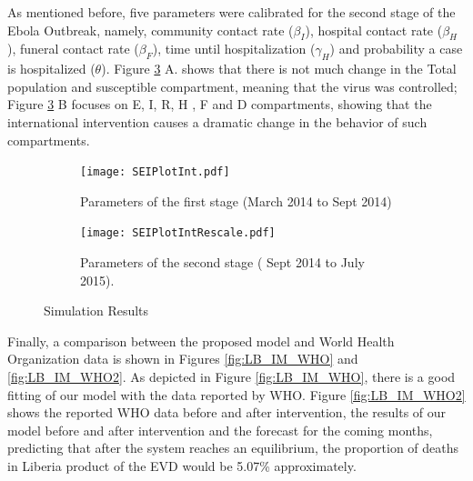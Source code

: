 \noindent As mentioned before, five parameters were calibrated for the second stage of the Ebola Outbreak, namely, community contact rate ($\beta_I$), hospital contact rate ($\beta_H$), funeral contact rate ($\beta_F$), time until hospitalization ($\gamma_H$) and probability a case is hospitalized ($\theta$). Figure \ref{fig:LB_IM_In} A. shows that there is not much change in the Total population and susceptible compartment, meaning that the virus was controlled;  Figure \ref{fig:LB_IM_In} B focuses on E, I, R, H , F and D compartments, showing that the international intervention causes a dramatic change in the behavior of such compartments.


\begin{figure}[h!]
 \centering 
 \begin{subfigure}[b]{1\textwidth}
  \texttt{[image: SEIPlotInt.pdf]} \caption{ Parameters of the first stage (March 2014  to Sept 2014)} \label{fig:LB_IM_In1} \end{subfigure}
 \hspace{.1cm}
\begin{subfigure}[b]{1\textwidth}
 \texttt{[image: SEIPlotIntRescale.pdf]} \caption{ Parameters of the second stage ( Sept 2014 to July 2015).} \label{fig:LB_IM_In2} \end{subfigure} \caption{Simulation Results}
\label{fig:LB_IM_In} 
\end{figure}






\noindent Finally, a comparison between the proposed model and World Health Organization data is shown in Figures \ref{fig:LB_IM_WHO} and \ref{fig:LB_IM_WHO2}. As depicted in Figure \ref{fig:LB_IM_WHO}, there is a good fitting of our model with the data reported by WHO. Figure \ref{fig:LB_IM_WHO2} shows  the reported WHO data before and after intervention, the results of our model before and after intervention and the forecast for the coming months, predicting that after the system reaches an equilibrium, the proportion of deaths in Liberia product of the EVD would be 5.07\% approximately.



